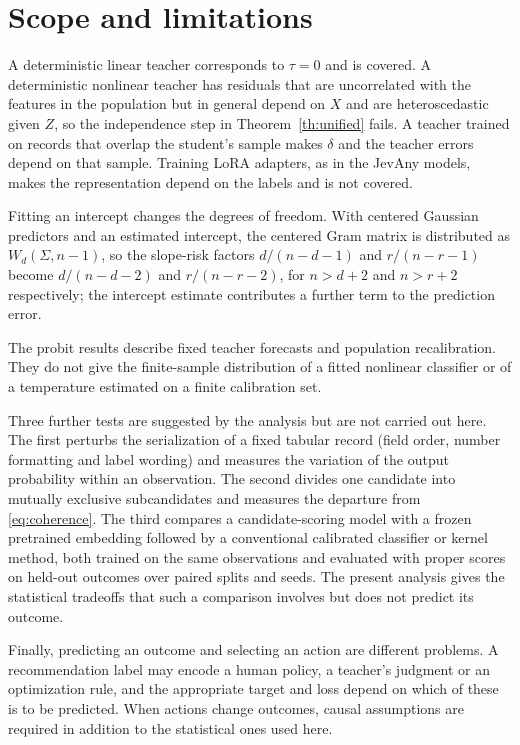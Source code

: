 \documentclass[11pt]{article}
\theoremstyle{remark}
\newcommand{\1}{\mathbf 1}
\begin{document}
\section{Scope and limitations}\label{sec:limits}
A deterministic linear teacher corresponds to $\tau=0$ and is covered. A deterministic nonlinear teacher has residuals that are uncorrelated with the features in the population but in general depend on $X$ and are heteroscedastic given $Z$, so the independence step in Theorem~\ref{th:unified} fails. A teacher trained on records that overlap the student's sample makes $\delta$ and the teacher errors depend on that sample. Training LoRA adapters, as in the JevAny models, makes the representation depend on the labels and is not covered.

Fitting an intercept changes the degrees of freedom. With centered Gaussian predictors and an estimated intercept, the centered Gram matrix is distributed as $W_d(\Sigma,n-1)$, so the slope-risk factors $d/(n-d-1)$ and $r/(n-r-1)$ become $d/(n-d-2)$ and $r/(n-r-2)$, for $n>d+2$ and $n>r+2$ respectively; the intercept estimate contributes a further term to the prediction error.

The probit results describe fixed teacher forecasts and population recalibration. They do not give the finite-sample distribution of a fitted nonlinear classifier or of a temperature estimated on a finite calibration set.

Three further tests are suggested by the analysis but are not carried out here. The first perturbs the serialization of a fixed tabular record (field order, number formatting and label wording) and measures the variation of the output probability within an observation. The second divides one candidate into mutually exclusive subcandidates and measures the departure from \eqref{eq:coherence}. The third compares a candidate-scoring model with a frozen pretrained embedding followed by a conventional calibrated classifier or kernel method, both trained on the same observations and evaluated with proper scores on held-out outcomes over paired splits and seeds. The present analysis gives the statistical tradeoffs that such a comparison involves but does not predict its outcome.

Finally, predicting an outcome and selecting an action are different problems. A recommendation label may encode a human policy, a teacher's judgment or an optimization rule, and the appropriate target and loss depend on which of these is to be predicted. When actions change outcomes, causal assumptions are required in addition to the statistical ones used here.
\end{document}
